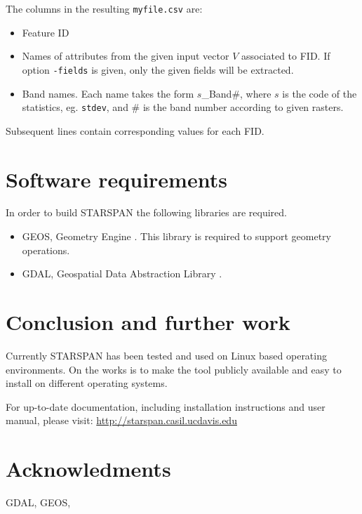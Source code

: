 \documentclass{elsart}
\newcommand{\starspan}{STARSPAN{}}
\begin{document}
The columns in the resulting \verb|myfile.csv| are:

	\begin{itemize}
		\item Feature ID 
		\item Names of attributes from the given input vector $V$ associated to FID. 
				If option \verb|-fields| is given, only the given fields will be extracted. 
		\item Band names. Each name takes the form $s$\_Band\#, where $s$
				is the code of the statistics, eg. \verb|stdev|, and \# is the band number 
				according to given rasters.  
	\end{itemize}

Subsequent lines contain corresponding values for each FID.

\section{Software requirements}

	In order to build \starspan{} the following libraries are required.
	
	\begin{itemize}
		\item GEOS, Geometry Engine \citep{geos}.
				This library is required to support geometry operations.
				
		\item GDAL, Geospatial Data Abstraction Library \citep{gdal}.
	\end{itemize}



\section{Conclusion and further work}

	Currently \starspan{} has been tested and used on Linux based operating
	environments. On the works is to make the tool publicly available and easy
	to install on different operating systems.


	For up-to-date documentation, including installation instructions and user
	manual, please visit: \url{http://starspan.casil.ucdavis.edu}

\section*{Acknowledments}

	GDAL, GEOS, 


	


\end{document}

